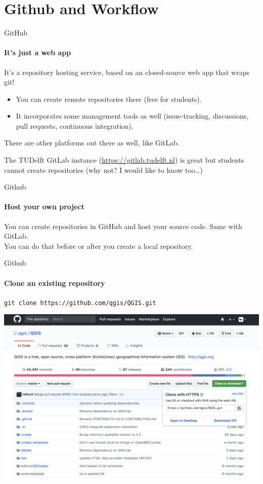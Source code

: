 \documentclass[aspectratio=169]{beamer}
\begin{document}
\section{Github and Workflow}

\begin{frame}{GitHub}
\framesubtitle{It's just a web app}
It's a repository hosting service, based on an closed-source web app that wraps git!

\begin{itemize}
	\item You can create remote repositories there (free for students).
	\item It incorporates some management tools as well (issue-tracking, discussions, pull requests, continuous integration).
\end{itemize}

There are other platforms out there as well, like GitLab.

The TUDelft GitLab instance (\url{https://gitlab.tudelft.nl}) is great but students cannot create repositories (why not? I would like to know too\ldots)
\end{frame}

\begin{frame}{Github}
\framesubtitle{Host your own project}
You can create repositories in GitHub and host your source code. Same with GitLab.
\\
You can do that before or after you create a local repository.
\end{frame}

\begin{frame}{Github}
\framesubtitle{Clone an existing repository}
\alert{\texttt{git clone https://github.com/qgis/QGIS.git}}

\includegraphics[width=\textwidth]{resources/github.png}
\end{frame}
    
\end{document}
